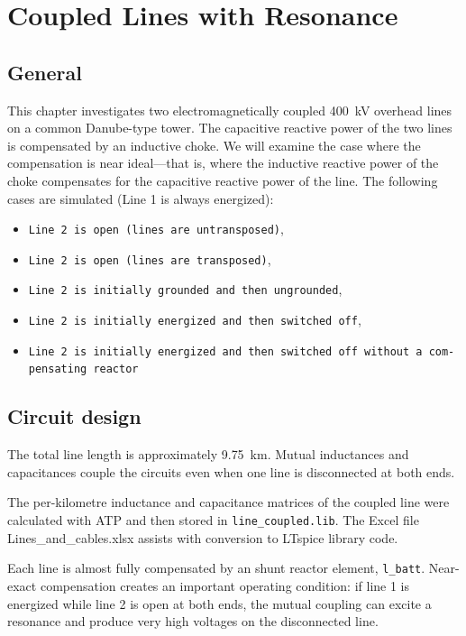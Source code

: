 \chapter{Coupled Lines with Resonance}
\label{chap:coupled-lines-resonance}

\section{General}
\label{sec:coupled-lines-general}

This chapter investigates two electromagnetically coupled
\SI{400}{\kilo\volt} overhead lines on a common Danube-type tower. 
The capacitive reactive power of the two lines is compensated by an inductive choke. We will examine the case where the compensation is near ideal—that is, where the inductive reactive power of the choke compensates for the capacitive reactive power of the line.
The following cases are simulated (Line 1 is always energized):

\begin{itemize}
	\item \texttt{Line 2 is open (lines are untransposed)},
	\item \texttt{Line 2 is open (lines are transposed)},
	\item \texttt{Line 2 is initially grounded and then ungrounded},
	\item \texttt{Line 2 is initially energized and then switched off},
	\item \texttt{Line 2 is initially energized and then switched off without a com-pensating reactor}
\end{itemize}

\section{Circuit design}
The total
line length is approximately \SI{9.75}{\kilo\metre}. Mutual inductances and
capacitances couple the circuits even when one line is disconnected at both
ends.

The per-kilometre inductance and capacitance matrices of the coupled line were calculated with ATP
and then stored in \texttt{line\_coupled.lib}.
The Excel file Lines\_and\_cables.xlsx assists with conversion to LTspice library code.

Each line is almost fully compensated by an shunt reactor
element, \texttt{l\_batt}. Near-exact compensation creates an important
operating condition: if line 1 is energized while line 2 is open at both ends,
the mutual coupling can excite a resonance and produce very high voltages on
the disconnected line.

